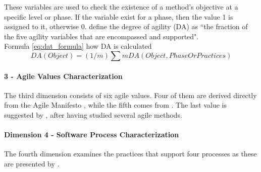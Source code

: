 These variables are used to check the existence of a method's objective at a specific level or phase. If the variable exist for a phase, then the value 1 is assigned to it, otherwise 0. \citet{qumer2006measuring} define the degree of agility (DA) as ``the fraction of the five agility variables that are encompassed and supported".\\ %

Formula \eqref{eq:dat_formula} how DA is calculated\\
\begin{equation} \label{eq:dat_formula} DA (Object) = (1/m) \sum m DA(Object, Phase Or Practices) \end{equation}


\paragraph{3 - Agile Values Characterization}
The third dimension consists of six agile values. Four of them are derived directly from the Agile Manifesto \cite{beck2001agile}, while the fifth comes from \citet{koch2005agile}. The last value is suggested by \citet{qumer2006measuring}, after having studied several agile methods. %


\paragraph{Dimension 4 - Software Process Characterization}
The fourth dimension examines the practices that support four processes as these are presented by \citet{qumer2006measuring}. %

